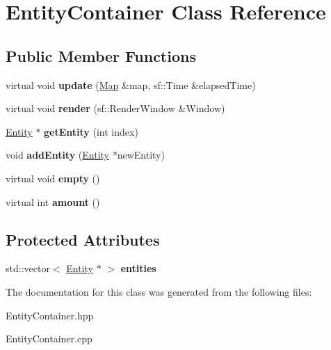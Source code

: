 \hypertarget{class_entity_container}{\section{Entity\-Container Class Reference}
\label{class_entity_container}
}
\subsection*{Public Member Functions}
\begin{DoxyCompactItemize}
\item 
\hypertarget{class_entity_container_ac0c475afef35afacc68222858c7c1235}{virtual void {\bfseries update} (\hyperlink{class_map}{Map} \&map, sf\-::\-Time \&elapsed\-Time)}\label{class_entity_container_ac0c475afef35afacc68222858c7c1235}

\item 
\hypertarget{class_entity_container_af531a5ba2b41416fdb96c879b6d8a322}{virtual void {\bfseries render} (sf\-::\-Render\-Window \&Window)}\label{class_entity_container_af531a5ba2b41416fdb96c879b6d8a322}

\item 
\hypertarget{class_entity_container_a12f72f7801d0a84977a8909952ffbf62}{\hyperlink{class_entity}{Entity} $\ast$ {\bfseries get\-Entity} (int index)}\label{class_entity_container_a12f72f7801d0a84977a8909952ffbf62}

\item 
\hypertarget{class_entity_container_adfe05295a0f40712bd07f0fb1f7c03d4}{void {\bfseries add\-Entity} (\hyperlink{class_entity}{Entity} $\ast$new\-Entity)}\label{class_entity_container_adfe05295a0f40712bd07f0fb1f7c03d4}

\item 
\hypertarget{class_entity_container_a39817a5176ff360fcf935b95eeef7f73}{virtual void {\bfseries empty} ()}\label{class_entity_container_a39817a5176ff360fcf935b95eeef7f73}

\item 
\hypertarget{class_entity_container_a8f950aea4e2c12ef425fff9c4b718247}{virtual int {\bfseries amount} ()}\label{class_entity_container_a8f950aea4e2c12ef425fff9c4b718247}

\end{DoxyCompactItemize}
\subsection*{Protected Attributes}
\begin{DoxyCompactItemize}
\item 
\hypertarget{class_entity_container_aa68925e602b9f5836a65ec47e1f85921}{std\-::vector$<$ \hyperlink{class_entity}{Entity} $\ast$ $>$ {\bfseries entities}}\label{class_entity_container_aa68925e602b9f5836a65ec47e1f85921}

\end{DoxyCompactItemize}


The documentation for this class was generated from the following files\-:\begin{DoxyCompactItemize}
\item 
Entity\-Container.\-hpp\item 
Entity\-Container.\-cpp\end{DoxyCompactItemize}
